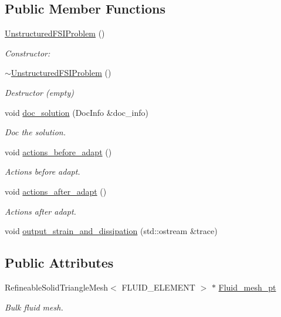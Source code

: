 \subsection*{Public Member Functions}
\begin{DoxyCompactItemize}
\item 
\hyperlink{classUnstructuredFSIProblem_a6a31fd839e0215ef1312942cf7284bd2}{Unstructured\+F\+S\+I\+Problem} ()
\begin{DoxyCompactList}\small\item\em Constructor\+: \end{DoxyCompactList}\item 
\hyperlink{classUnstructuredFSIProblem_a976a81e0dee902f6713bd8ca4d79d000}{$\sim$\+Unstructured\+F\+S\+I\+Problem} ()
\begin{DoxyCompactList}\small\item\em Destructor (empty) \end{DoxyCompactList}\item 
void \hyperlink{classUnstructuredFSIProblem_a15f581318b505de07f50bd570da8c8d0}{doc\+\_\+solution} (Doc\+Info \&doc\+\_\+info)
\begin{DoxyCompactList}\small\item\em Doc the solution. \end{DoxyCompactList}\item 
void \hyperlink{classUnstructuredFSIProblem_a47a4307323e4dd598fdca542144f4bd2}{actions\+\_\+before\+\_\+adapt} ()
\begin{DoxyCompactList}\small\item\em Actions before adapt. \end{DoxyCompactList}\item 
void \hyperlink{classUnstructuredFSIProblem_ae91b90874744a5eb1870da3873841e09}{actions\+\_\+after\+\_\+adapt} ()
\begin{DoxyCompactList}\small\item\em Actions after adapt. \end{DoxyCompactList}\item 
void \hyperlink{classUnstructuredFSIProblem_ab6430426df11c9d690539f6d5d4fbf2e}{output\+\_\+strain\+\_\+and\+\_\+dissipation} (std\+::ostream \&trace)
\end{DoxyCompactItemize}
\subsection*{Public Attributes}
\begin{DoxyCompactItemize}
\item 
Refineable\+Solid\+Triangle\+Mesh$<$ F\+L\+U\+I\+D\+\_\+\+E\+L\+E\+M\+E\+NT $>$ $\ast$ \hyperlink{classUnstructuredFSIProblem_a97363ac2b89dd5d37e969b30a4f14ad4}{Fluid\+\_\+mesh\+\_\+pt}
\begin{DoxyCompactList}\small\item\em Bulk fluid mesh. \end{DoxyCompactList}\end{DoxyCompactItemize}
